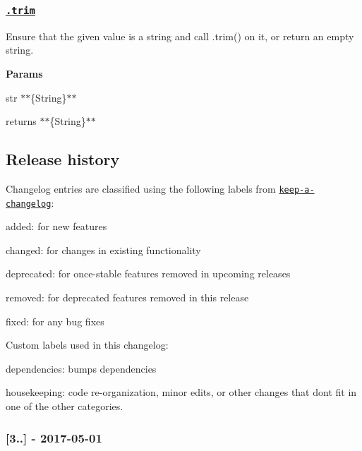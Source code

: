 \subsubsection*{\href{index.js#L961}{\tt .trim}}

Ensure that the given value is a string and call {\ttfamily .trim()} on it, or return an empty string.

{\bfseries Params}


\begin{DoxyItemize}
\item {\ttfamily str} $\ast$$\ast$\{String\}$\ast$$\ast$
\item {\ttfamily returns} $\ast$$\ast$\{String\}$\ast$$\ast$
\end{DoxyItemize}

\subsection*{Release history}

Changelog entries are classified using the following labels from \href{https://github.com/olivierlacan/keep-a-changelog}{\tt keep-\/a-\/changelog}\+:


\begin{DoxyItemize}
\item {\ttfamily added}\+: for new features
\item {\ttfamily changed}\+: for changes in existing functionality
\item {\ttfamily deprecated}\+: for once-\/stable features removed in upcoming releases
\item {\ttfamily removed}\+: for deprecated features removed in this release
\item {\ttfamily fixed}\+: for any bug fixes
\end{DoxyItemize}

Custom labels used in this changelog\+:


\begin{DoxyItemize}
\item {\ttfamily dependencies}\+: bumps dependencies
\item {\ttfamily housekeeping}\+: code re-\/organization, minor edits, or other changes that don\textquotesingle{}t fit in one of the other categories.
\end{DoxyItemize}

\subsubsection*{\mbox{[}3..\mbox{]} -\/ 2017-\/05-\/01}

